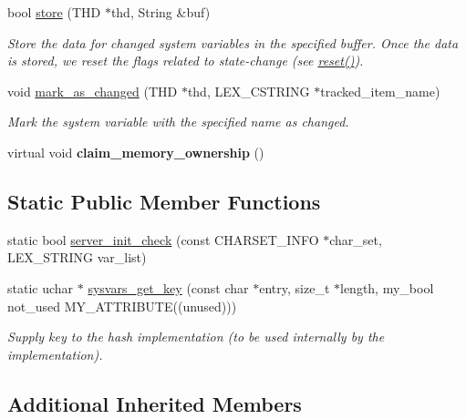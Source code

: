 \begin{DoxyCompactItemize}
bool \mbox{\hyperlink{classSession__sysvars__tracker_a518ef2f3fae3c779cf182a391683b22e}{store}} (T\+HD $\ast$thd, String \&buf)
\begin{DoxyCompactList}\small\item\em Store the data for changed system variables in the specified buffer. Once the data is stored, we reset the flags related to state-\/change (see \mbox{\hyperlink{classSession__sysvars__tracker_a1b134fe57695e59ddef1d20ab2044036}{reset()}}). \end{DoxyCompactList}\item 
void \mbox{\hyperlink{classSession__sysvars__tracker_adeca89d5fa8be0279ec522c7afd8fcae}{mark\+\_\+as\+\_\+changed}} (T\+HD $\ast$thd, L\+E\+X\+\_\+\+C\+S\+T\+R\+I\+NG $\ast$tracked\+\_\+item\+\_\+name)
\begin{DoxyCompactList}\small\item\em Mark the system variable with the specified name as changed. \end{DoxyCompactList}\item 
\mbox{\label{classSession__sysvars__tracker_a3fe9b6e076c359805d56957195551f65}} 
virtual void {\bfseries claim\+\_\+memory\+\_\+ownership} ()
\end{DoxyCompactItemize}
\subsection*{Static Public Member Functions}
\begin{DoxyCompactItemize}
\item 
static bool \mbox{\hyperlink{classSession__sysvars__tracker_a53ed673ab98982fd3dd55dea54d0b61c}{server\+\_\+init\+\_\+check}} (const C\+H\+A\+R\+S\+E\+T\+\_\+\+I\+N\+FO $\ast$char\+\_\+set, L\+E\+X\+\_\+\+S\+T\+R\+I\+NG var\+\_\+list)
\item 
static uchar $\ast$ \mbox{\hyperlink{classSession__sysvars__tracker_a379d5a9d10ca357f185984cf6bbf8509}{sysvars\+\_\+get\+\_\+key}} (const char $\ast$entry, size\+\_\+t $\ast$length, my\+\_\+bool not\+\_\+used M\+Y\+\_\+\+A\+T\+T\+R\+I\+B\+U\+TE((unused)))
\begin{DoxyCompactList}\small\item\em Supply key to the hash implementation (to be used internally by the implementation). \end{DoxyCompactList}\end{DoxyCompactItemize}
\subsection*{Additional Inherited Members}


